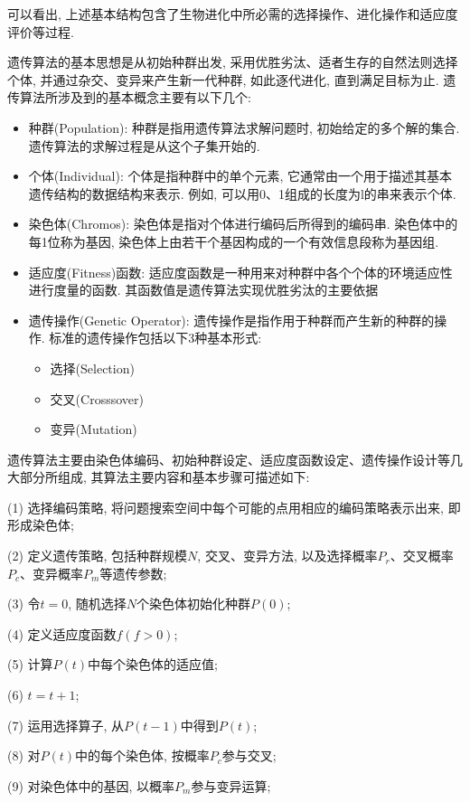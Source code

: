 可以看出, 上述基本结构包含了生物进化中所必需的选择操作、进化操作和适应度评价等过程.

遗传算法的基本思想是从初始种群出发, 采用优胜劣汰、适者生存的自然法则选择个体, 并通过杂交、变异来产生新一代种群, 如此逐代进化, 直到满足目标为止. 遗传算法所涉及到的基本概念主要有以下几个:
\begin{itemize}
\item 种群(Population): 种群是指用遗传算法求解问题时, 初始给定的多个解的集合. 遗传算法的求解过程是从这个子集开始的.
\item 个体(Individual): 个体是指种群中的单个元素, 它通常由一个用于描述其基本遗传结构的数据结构来表示. 例如, 可以用0、1组成的长度为l的串来表示个体.
\item 染色体(Chromos): 染色体是指对个体进行编码后所得到的编码串. 染色体中的每1位称为基因, 染色体上由若干个基因构成的一个有效信息段称为基因组.
\item 适应度(Fitness)函数: 适应度函数是一种用来对种群中各个个体的环境适应性进行度量的函数. 其函数值是遗传算法实现优胜劣汰的主要依据
\item 遗传操作(Genetic Operator): 遗传操作是指作用于种群而产生新的种群的操作. 标准的遗传操作包括以下3种基本形式:
\begin{itemize}
    \item 选择(Selection)
    \item 交叉(Crosssover)
    \item 变异(Mutation)
\end{itemize}
\end{itemize}

遗传算法主要由染色体编码、初始种群设定、适应度函数设定、遗传操作设计等几大部分所组成, 其算法主要内容和基本步骤可描述如下:

(1) 选择编码策略, 将问题搜索空间中每个可能的点用相应的编码策略表示出来, 即形成染色体;

(2) 定义遗传策略, 包括种群规模$N$, 交叉、变异方法, 以及选择概率$P_r$、交叉概率$P_c$、变异概率$P_m$等遗传参数;

(3) 令$t=0$, 随机选择$N$个染色体初始化种群$P(0)$;

(4) 定义适应度函数$f(f>0)$;

(5) 计算$P(t)$中每个染色体的适应值;

(6) $t=t+1$;

(7) 运用选择算子, 从$P(t-1)$中得到$P(t)$;

(8) 对$P(t)$中的每个染色体, 按概率$P_c$参与交叉;

(9) 对染色体中的基因, 以概率$P_m$参与变异运算;

